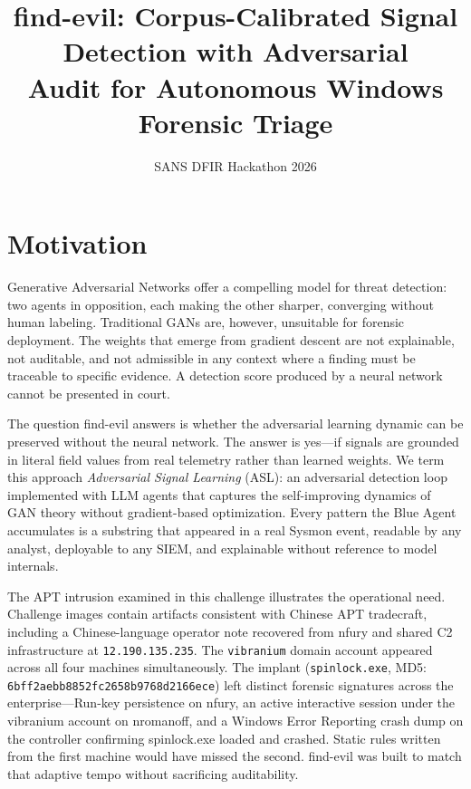 \documentclass[sigconf, nonacm]{acmart}
\title{find-evil: Corpus-Calibrated Signal Detection with Adversarial\\
       Audit for Autonomous Windows Forensic Triage}
\author{SANS DFIR Hackathon 2026}
\affiliation{\institution{Category 7 — Persistent Learning Loop}}
\begin{document}
\maketitle

\section{Motivation}

Generative Adversarial Networks offer a compelling model for
threat detection: two agents in opposition, each making the other
sharper, converging without human labeling. Traditional GANs are,
however, unsuitable for forensic deployment. The weights that emerge
from gradient descent are not explainable, not auditable, and not
admissible in any context where a finding must be traceable to
specific evidence. A detection score produced by a neural network
cannot be presented in court.

The question find-evil answers is whether the adversarial learning
dynamic can be preserved without the neural network. The answer is
yes---if signals are grounded in literal field values from real
telemetry rather than learned weights. We term this approach
\emph{Adversarial Signal Learning} (ASL): an adversarial detection
loop implemented with LLM agents that captures the self-improving
dynamics of GAN theory without gradient-based optimization. Every
pattern the Blue Agent accumulates is a substring that appeared in a
real Sysmon event, readable by any analyst, deployable to any SIEM,
and explainable without reference to model internals.

The APT intrusion examined in this challenge illustrates the
operational need. Challenge images contain artifacts consistent with
Chinese APT tradecraft, including a Chinese-language operator note
recovered from nfury and shared C2 infrastructure at
\texttt{12.190.135.235}. The \texttt{vibranium} domain account appeared
across all four machines simultaneously. The implant
(\texttt{spinlock.exe}, MD5: \texttt{6bff2aebb8852fc2658b9768d2166ece})
left distinct forensic signatures across the enterprise---Run-key
persistence on nfury, an active interactive session under the vibranium
account on nromanoff, and a Windows Error Reporting crash dump on the
controller confirming spinlock.exe loaded and crashed. Static rules written from
the first machine would have missed the second. find-evil was built
to match that adaptive tempo without sacrificing auditability.
\end{document}
